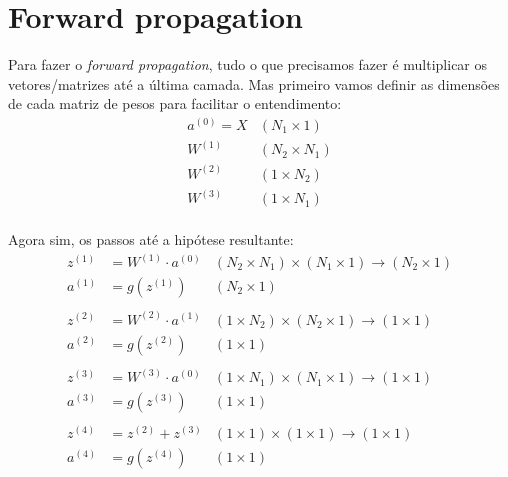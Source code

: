 \documentclass[10pt, a4paper]{article}
\begin{document}
\section{Forward propagation}

Para fazer o \textit{forward propagation}, tudo o que precisamos fazer é multiplicar os vetores/matrizes até a última camada. Mas primeiro vamos definir as dimensões de cada matriz de pesos para facilitar o entendimento:
\\
\begin{align*} \nonumber
a^{(0)} = X & (N_1 \times 1) \\
W^{(1)} & (N_2 \times N_1) \\
W^{(2)} & (1 \times N_2) \\
W^{(3)} & (1 \times N_1)
\end{align*}
\\
Agora sim, os passos até a hipótese resultante:
\\
\begin{align*} \nonumber
z^{(1)} &= W^{(1)} \cdot a^{(0)} & (N_2 \times N_1) \times (N_1 \times 1) \to (N_2 \times 1) \\
a^{(1)} &= g(z^{(1)}) & (N_2 \times 1) \\
\\
z^{(2)} &= W^{(2)} \cdot a^{(1)} & (1 \times N_2) \times (N_2 \times 1) \to (1 \times 1) \\
a^{(2)} &= g(z^{(2)}) & (1 \times 1) \\
\\
z^{(3)} &= W^{(3)} \cdot a^{(0)} & (1 \times N_1) \times (N_1 \times 1) \to (1 \times 1) \\
a^{(3)} &= g(z^{(3)}) & (1 \times 1) \\
\\
z^{(4)} &= z^{(2)} + z^{(3)} & (1 \times 1) \times (1 \times 1) \to (1 \times 1) \\
a^{(4)} &= g(z^{(4)}) & (1 \times 1) 
\end{align*}
\end{document}
